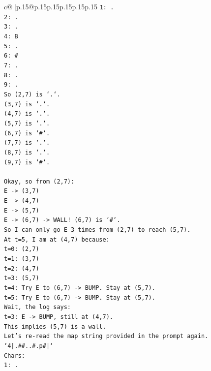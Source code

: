 \documentclass{article}
\begin{document}
{\begin{supertabular}{c@{$\;$}|p{.15\linewidth}@{}p{.15\linewidth}p{.15\linewidth}p{.15\linewidth}p{.15\linewidth}p{.15\linewidth}}
{{{\texttt{1: .} \\
\texttt{2: .} \\
\texttt{3: .} \\
\texttt{4: B} \\
\texttt{5: .} \\
\texttt{6: \#} \\
\texttt{7: .} \\
\texttt{8: .} \\
\texttt{9: .} \\
\texttt{So (2,7) is `.`.} \\
\texttt{(3,7) is `.`.} \\
\texttt{(4,7) is `.`.} \\
\texttt{(5,7) is `.`.} \\
\texttt{(6,7) is `\#`.} \\
\texttt{(7,7) is `.`.} \\
\texttt{(8,7) is `.`.} \\
\texttt{(9,7) is `\#`.} \\
\\ 
\texttt{Okay, so from (2,7):} \\
\texttt{E {-}> (3,7)} \\
\texttt{E {-}> (4,7)} \\
\texttt{E {-}> (5,7)} \\
\texttt{E {-}> (6,7) {-}> WALL! (6,7) is `\#`.} \\
\texttt{So I can only go E 3 times from (2,7) to reach (5,7).} \\
\texttt{At t=5, I am at (4,7) because:} \\
\texttt{t=0: (2,7)} \\
\texttt{t=1: (3,7)} \\
\texttt{t=2: (4,7)} \\
\texttt{t=3: (5,7)} \\
\texttt{t=4: Try E to (6,7) {-}> BUMP. Stay at (5,7).} \\
\texttt{t=5: Try E to (6,7) {-}> BUMP. Stay at (5,7).} \\
\texttt{Wait, the log says:} \\
\texttt{t=3: E {-}> BUMP, still at (4,7).} \\
\texttt{This implies (5,7) is a wall.} \\
\texttt{Let's re{-}read the map string provided in the prompt again.} \\
\texttt{`4|.\#\#..\#.p\#|`} \\
\texttt{Chars:} \\
\texttt{1: .} \\
}}}
\end{supertabular}}
\end{document}
